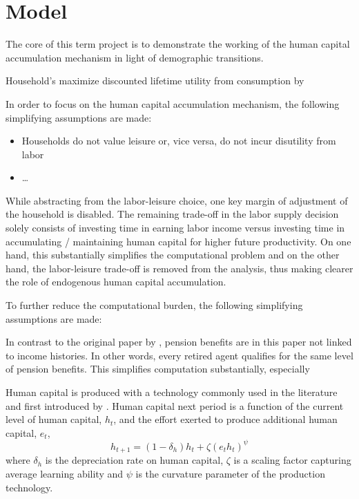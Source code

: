\section{Model}
\label{sec:model}

The core of this term project is to demonstrate the working of the human capital accumulation mechanism in light of demographic transitions.

Household's maximize discounted lifetime utility from consumption by

In order to focus on the human capital accumulation mechanism, the following simplifying assumptions are made:
\begin{itemize}
    \item Households do not value leisure or, vice versa, do not incur disutility from labor
    \item \dots
\end{itemize}

While abstracting from the labor-leisure choice, one key margin of adjustment of the household is disabled. The remaining trade-off in the labor supply decision solely consists of investing time in earning labor income versus investing time in accumulating / maintaining human capital for higher future productivity. On one hand, this substantially simplifies the computational problem and on the other hand, the labor-leisure trade-off is removed from the analysis, thus making clearer the role of endogenous human capital accumulation.

To further reduce the computational burden, the following simplifying assumptions are made:

In contrast to the original paper by \cite{LudwigSchelkleVogel2012}, pension benefits are in this paper not linked to income histories. In other words, every retired agent qualifies for the same level of pension benefits. This simplifies computation substantially, especially

Human capital is produced with a technology commonly used in the literature and first introduced by \cite{Ben-Porath1960}. Human capital next period is a function of the current level of human capital, $h_t$, and the effort exerted to produce additional human capital, $e_t$,
$$ h_{t+1} = (1-\delta_h) h_t + \zeta (e_t h_t)^\psi$$
where $\delta_h$ is the depreciation rate on human capital, $\zeta$ is a scaling factor capturing average learning ability and $\psi$ is the curvature parameter of the production technology.

